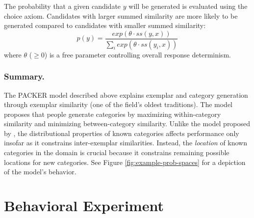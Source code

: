 \documentclass[10pt,letterpaper]{article}
\newcommand\inputpgf[2]{{
\let\pgfimageWithoutPath\pgfimage
\renewcommand{\pgfimage}[2][]{\pgfimageWithoutPath[##1]{#1/##2}}

}}
\begin{document}
The probability that a given candidate $y$ will be generated is evaluated using the \citet{luce1977choice} choice axiom. Candidates with larger summed similarity are more likely to be generated compared to candidates with smaller summed similarity:
\begin{equation}
p(y) = \dfrac
    { exp( { \theta \cdot ss(y, x) } ) }
    { \sum_i{ exp( { \theta \cdot ss(y_i, x) } ) } }
\end{equation}
where $\theta$ ($\geq 0$) is a free parameter controlling overall response determinism. 


\begin{figure*}
    \begin{center}
    \inputpgf{figs/}{example-prob-spaces.pgf}
    \caption{Predicted generation of a category `B' example, following exposure to one member of category `A' and one member of category `B'. Areas in which generation is not likely are shaded white; high probability areas are shaded blue. \textit{Left}: Predictions given $\{\phi = -1$, $\gamma = 0\}$ (contrast influence only). \textit{Center}: Predictions given $\{\phi = 0$, $\gamma = 1\}$ (target influence only).  \textit{Right}: Predictions given $\{\phi = -1$, $\gamma = 1\}$ (both constraints considered).  }
    \label{fig:example-prob-spaces}
    \end{center}
\end{figure*}

\subsubsection{Summary.}
The PACKER model described above explains exemplar and category generation through exemplar similarity (one of the field's oldest traditions). The model proposes that people generate categories by maximizing within-category similarity and minimizing between-category similarity. Unlike the model proposed by \citet{jern2013probabilistic}, the distributional properties of known categories affects performance only insofar as it constrains inter-exemplar similarities. Instead, the \textit{location} of known categories in the domain is crucial because it constrains remaining possible locations for new categories. See Figure \ref{fig:example-prob-spaces} for a depiction of the model's behavior.

\section{Behavioral Experiment}
\end{document}
